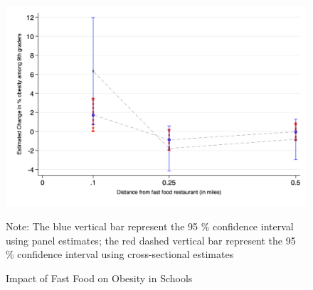 \documentclass[11pt]{article}
\begin{document}
\begin{figure}[H]
\vspace{0.5cm}
\begin{center}
\caption{\label{fig: obes_schools} Impact of Fast Food on Obesity in Schools}
\includegraphics[width=130 mm, height=90 mm]{../figures/figure1A.png} 
\end{center}
\vspace{-0.3cm}
\par
\begin{minipage}{ \linewidth}
\scriptsize{Note: The blue vertical bar represent the 95 \% confidence interval using panel estimates; the red dashed vertical bar represent the 95 \% confidence interval using cross-sectional estimates}
\end{minipage}

\end{figure}
\end{document}
